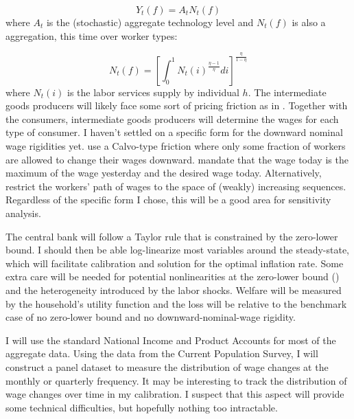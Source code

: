 \documentclass[12pt,a4paper]{article}            %
\begin{document}
\begin{equation*}
    Y_t(f) = A_t N_t(f)
\end{equation*}
where $A_t$ is the (stochastic) aggregate technology level and $N_t(f)$ is also a aggregation, this time over worker types:

\begin{equation*}
    N_t(f) = \left[\int_{0}^{1} N_t(i)^{\frac{\eta - 1}{\eta} } di \right]^{ \frac{\eta}{1 - \eta} }
\end{equation*}
where $N_t(i)$ is the labor services supply by individual $h$.
The intermediate goods producers will likely face some sort of pricing friction as in \cite{calvo_1983}.
Together with the consumers, intermediate goods producers will determine the wages for each type of consumer.
I haven't settled on a specific form for the downward nominal wage rigidities yet.
\cite{daly_hobijn_2013} use a Calvo-type friction where only some fraction of workers are allowed to change their wages downward.
\cite{coibon_gorodnichenko_wieland_2012} mandate that the wage today is the maximum of the wage yesterday and the desired wage today.
Alternatively, \cite{benigno_ricci_2011} restrict the workers' path of wages to the space of (weakly) increasing sequences.
Regardless of the specific form I chose, this will be a good area for sensitivity analysis.

The central bank will follow a Taylor rule that is constrained by the zero-lower bound.
I should then be able log-linearize most variables around the steady-state, which will facilitate calibration and solution for the optimal inflation rate.
Some extra care will be needed for potential nonlinearities at the zero-lower bound (\citealt{fv_gordon_gq_rr_2012}) and the heterogeneity introduced by the labor shocks.
Welfare will be measured by the household's utility function and the loss will be relative to the benchmark case of no zero-lower bound and no downward-nominal-wage rigidity.

I will use the standard National Income and Product Accounts for most of the aggregate data.
Using the data from the Current Population Survey, I will construct a panel dataset to measure the distribution of wage changes at the monthly or quarterly frequency.
It may be interesting to track the distribution of wage changes over time in my calibration.
I suspect that this aspect will provide some technical difficulties, but hopefully nothing too intractable.

\end{document}
